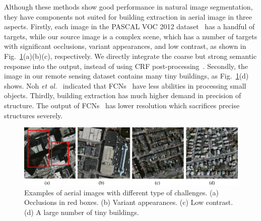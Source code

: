   Although these methods show good performance in natural image segmentation, they have components not suited for building extraction in aerial image in three aspects. 
	Firstly, each image in the PASCAL VOC 2012 dataset~\cite{pascal-voc-2012} has a handful of targets, while our source image is a complex scene, which has a number of targets with significant occlusions, variant appearances, and low contrast, as shown in Fig.~\ref{fig:AerialImages}(a)(b)(c), respectively. We directly integrate the coarse but strong semantic response into the output, instead of using CRF post-processing~\cite{Mnih2013Machine,chen14semantic}. 
	Secondly, the image in our remote sensing dataset contains many tiny buildings, as Fig.~\ref{fig:AerialImages}(d) shows. Noh \textit{et al.}~\cite{Noh2015Learning} indicated that FCNs~\cite{Long2014Fully} have less abilities in processing small objects.	%
	Thirdly, building extraction has much higher demand in precision of structure. The output of FCNs~\cite{Long2014Fully} has lower resolution which sacrifices precise structures severely.  
\begin{figure}
	\centering
	\label{fig:AerialImages}
	\includegraphics[width=120mm]{figs/AerialImages}
	\caption{Examples of aerial images with different type of challenges. (a) Occlusions in red boxes. (b) Variant appearances. (c) Low contrast. (d) A large number of tiny buildings. }
\end{figure}      

